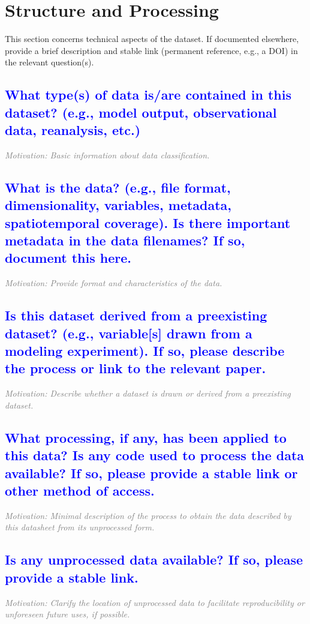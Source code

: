 \documentclass[letterpaper, 10 pt, transmag]{IEEEtran}
\begin{document}
\vspace{10mm}

\section{Structure and Processing}
This section concerns technical aspects of the dataset. If documented elsewhere, provide a brief description and stable link (permanent reference, e.g., a DOI) in the relevant question(s).

\textcolor{blue}{\subsection{What type(s) of data is/are contained in this dataset? (e.g., model output, observational data, reanalysis, etc.)}}
\textcolor{gray}{\textit{Motivation: Basic information about data classification.}}

\textcolor{blue}{\subsection{What is the data? (e.g., file format, dimensionality, variables, metadata, spatiotemporal coverage). Is there important metadata in the data filenames? If so, document this here.}}
\textcolor{gray}{\textit{Motivation: Provide format and characteristics of the data.}}

\textcolor{blue}{\subsection{Is this dataset derived from a preexisting dataset? (e.g., variable[s] drawn from a modeling experiment). If so, please describe the process or link to the relevant paper.}} 
\textcolor{gray}{\textit{Motivation: Describe whether a dataset is drawn or derived from a preexisting dataset.}}

\textcolor{blue}{\subsection{What processing, if any, has been applied to this data? Is any code used to process the data available? If so, please provide a stable link or other method of access.}}
\textcolor{gray}{\textit{Motivation: Minimal description of the process to obtain the data described by this datasheet from its unprocessed form.}}

\textcolor{blue}{\subsection{Is any unprocessed data available? If so, please provide a stable link.}}
\textcolor{gray}{\textit{Motivation: Clarify the location of unprocessed data to facilitate reproducibility or unforeseen future uses, if possible.}}
\end{document}
